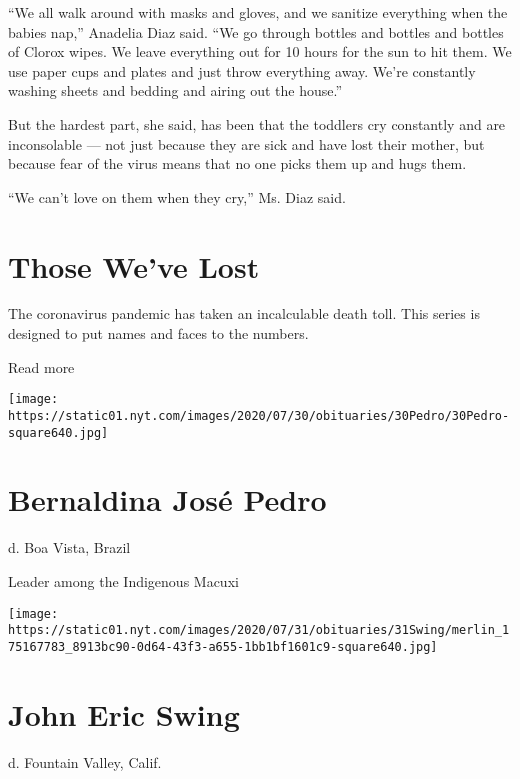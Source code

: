 ``We all walk around with masks and gloves, and we sanitize everything
when the babies nap,'' Anadelia Diaz said. ``We go through bottles and
bottles and bottles of Clorox wipes. We leave everything out for 10
hours for the sun to hit them. We use paper cups and plates and just
throw everything away. We're constantly washing sheets and bedding and
airing out the house.''

But the hardest part, she said, has been that the toddlers cry
constantly and are inconsolable --- not just because they are sick and
have lost their mother, but because fear of the virus means that no one
picks them up and hugs them.

``We can't love on them when they cry,'' Ms. Diaz said.

\href{https://www.nytimes.com/interactive/2020/obituaries/people-died-coronavirus-obituaries.html?action=click\&pgtype=Article\&state=default\&region=BELOW_MAIN_CONTENT\&context=covid_obits_promo}{}

\hypertarget{those-weve-lost}{%
\section{Those We've Lost}\label{those-weve-lost}}

The coronavirus pandemic has taken an incalculable death toll. This
series is designed to put names and faces to the numbers.

Read more

\texttt{[image: https://static01.nyt.com/images/2020/07/30/obituaries/30Pedro/30Pedro-square640.jpg]}

\hypertarget{bernaldina-josuxe9-pedro}{%
\section{Bernaldina José Pedro}\label{bernaldina-josuxe9-pedro}}

d. Boa Vista, Brazil

Leader among the Indigenous Macuxi

\texttt{[image: https://static01.nyt.com/images/2020/07/31/obituaries/31Swing/merlin\_175167783\_8913bc90-0d64-43f3-a655-1bb1bf1601c9-square640.jpg]}

\hypertarget{john-eric-swing}{%
\section{John Eric Swing}\label{john-eric-swing}}

d. Fountain Valley, Calif.

